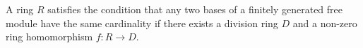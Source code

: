 A ring $R$ satisfies the condition that any two bases of a finitely generated free module have the same cardinality if there exists a division ring $D$ and a non-zero ring homomorphism $f: R \to D$.
